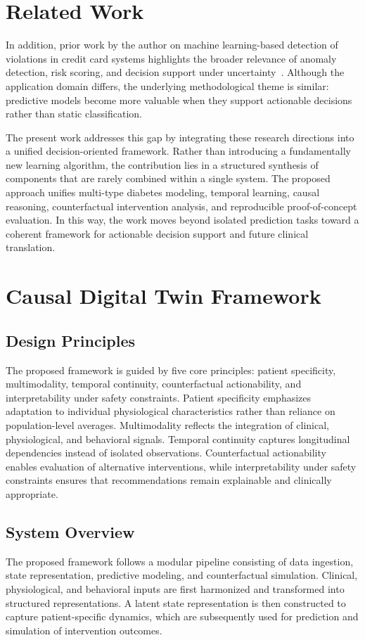 \documentclass[journal]{IEEEtran}
\begin{document}
\section{Related Work}

In addition, prior work by the author on machine learning-based detection of violations in credit card systems highlights the broader relevance of anomaly detection, risk scoring, and decision support under uncertainty~\cite{ref15}. Although the application domain differs, the underlying methodological theme is similar: predictive models become more valuable when they support actionable decisions rather than static classification.

The present work addresses this gap by integrating these research directions into a unified decision-oriented framework. Rather than introducing a fundamentally new learning algorithm, the contribution lies in a structured synthesis of components that are rarely combined within a single system. The proposed approach unifies multi-type diabetes modeling, temporal learning, causal reasoning, counterfactual intervention analysis, and reproducible proof-of-concept evaluation. In this way, the work moves beyond isolated prediction tasks toward a coherent framework for actionable decision support and future clinical translation.

\section{Causal Digital Twin Framework}
\subsection{Design Principles}
The proposed framework is guided by five core principles: patient specificity, multimodality, temporal continuity, counterfactual actionability, and interpretability under safety constraints. Patient specificity emphasizes adaptation to individual physiological characteristics rather than reliance on population-level averages. Multimodality reflects the integration of clinical, physiological, and behavioral signals. Temporal continuity captures longitudinal dependencies instead of isolated observations. Counterfactual actionability enables evaluation of alternative interventions, while interpretability under safety constraints ensures that recommendations remain explainable and clinically appropriate.

\subsection{System Overview}
The proposed framework follows a modular pipeline consisting of data ingestion, state representation, predictive modeling, and counterfactual simulation. Clinical, physiological, and behavioral inputs are first harmonized and transformed into structured representations. A latent state representation is then constructed to capture patient-specific dynamics, which are subsequently used for prediction and simulation of intervention outcomes.
\end{document}
